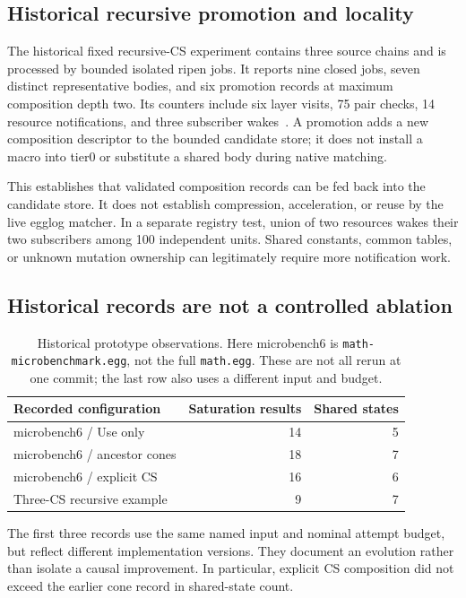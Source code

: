 \documentclass[11pt,a4paper]{article}
\begin{document}
\subsection{Historical recursive promotion and locality}
The historical fixed recursive-CS experiment contains three source chains and is processed by
bounded isolated ripen jobs. It reports nine closed jobs, seven distinct representative
bodies, and six promotion records at maximum composition depth two. Its counters
include six layer visits, 75 pair checks, 14 resource notifications, and three
subscriber wakes~\cite{evidence}. A promotion adds a new composition descriptor to
the bounded candidate store; it does not install a macro into tier0 or substitute a
shared body during native matching.

This establishes that validated composition records can be fed back into the
candidate store. It does not establish compression, acceleration, or reuse by the
live egglog matcher. In a separate
registry test, union of two resources wakes their two subscribers among 100
independent units. Shared constants, common tables, or unknown mutation ownership
can legitimately require more notification work.

\subsection{Historical records are not a controlled ablation}
\StatsFigure
\begin{table}[htbp]
\centering\small
\begin{tabular}{@{}lrr@{}}
\toprule
Recorded configuration & Saturation results & Shared states\\
\midrule
microbench6 / Use only & 14 & 5\\
microbench6 / ancestor cones & 18 & 7\\
microbench6 / explicit CS & 16 & 6\\
Three-CS recursive example & 9 & 7\\
\bottomrule
\end{tabular}
\caption{Historical prototype observations. Here microbench6 is
\texttt{math-microbenchmark.egg}, not the full \texttt{math.egg}.
These are not all rerun at one commit;
the last row also uses a different input and budget.}
\label{tab:observations}
\end{table}

The first three records use the same named input and nominal attempt budget,
but reflect different implementation versions. They document an evolution rather
than isolate a causal improvement. In particular, explicit CS composition did
not exceed the earlier cone record in shared-state count.
\end{document}

